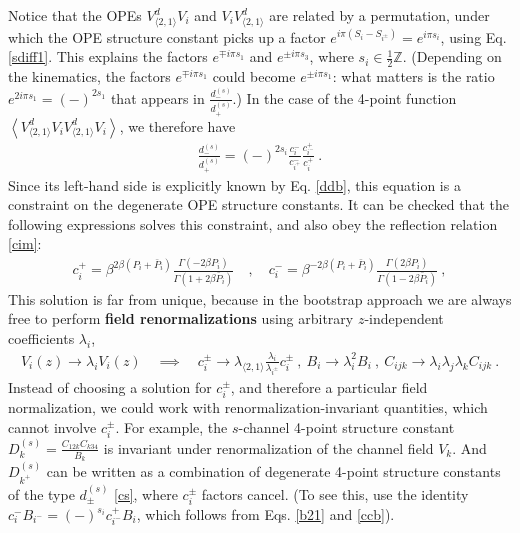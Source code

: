 \documentclass[12pt, a4paper]{article}
\newcommand{\myindex}[1]{\textbf{\boldmath #1}}
\begin{document}
Notice that the OPEs $V^d_{\langle 2,1\rangle}V_i$ and $V_iV^d_{\langle 2,1\rangle}$ are related by a permutation, under which the OPE structure constant picks up a factor $e^{i\pi(S_i-S_{i^\pm})} = e^{i\pi s_i}$, using Eq. \eqref{sdiff1}. 
This explains the factors $e^{\mp i\pi s_1}$ and $e^{\pm i\pi s_3}$, where $s_i\in\frac12\mathbb{Z}$.
(Depending on the kinematics, the factors $e^{\mp i\pi s_1}$ could become $e^{\pm i\pi s_1}$: what matters is the ratio $e^{2i\pi s_1}=(-)^{2s_1}$ that appears in $\frac{d^{(s)}_-}{d^{(s)}_+}$.)
In the case of the 4-point function $\left<V_{\langle 2,1\rangle}^d V_iV_{\langle 2,1\rangle}^d V_i\right>$, we therefore have
\begin{align}
 \frac{d^{(s)}_-}{d^{(s)}_+}= (-)^{2s_i}\frac{c_i^-}{c_{i^+}^-} \frac{c_{i^-}^+}{c_i^+}\ .
 \label{ddcccc}
\end{align}
Since its left-hand side is explicitly known by Eq. \eqref{ddb}, this equation is a constraint on the degenerate OPE structure constants.
It can be checked that the following expressions solves this constraint, and also obey the reflection relation \eqref{cim}: 
\begin{align}
 c^+_i = \beta^{2\beta(P_i+\bar P_i)} \frac{\Gamma(-2\beta P_i)}{\Gamma(1+2\beta \bar P_i)} \quad , \quad c^-_i = \beta^{-2\beta(P_i+\bar P_i)} \frac{\Gamma(2\beta P_i)}{\Gamma(1-2\beta \bar P_i)}\ ,
 \label{cpcm}
\end{align}
This solution is far from unique, because in the bootstrap approach we are always free to perform \myindex{field renormalizations} using arbitrary $z$-independent coefficients $\lambda_i$,
\begin{align}
 V_i(z) \to \lambda_i V_i(z)\quad \implies \quad c_i^\pm \to \lambda_{\langle 2,1\rangle}\frac{\lambda_i}{\lambda_{i^\pm}}c_i^\pm \ , \  B_i \to \lambda_i^2B_i \ , \ C_{ijk}\to \lambda_i\lambda_j\lambda_k C_{ijk}\ .
 \label{vlv}
\end{align}
Instead of choosing a solution for $c_i^\pm$, and therefore a particular field normalization, 
we could work with renormalization-invariant quantities, which cannot involve $c_i^\pm$. For example, the $s$-channel 4-point structure constant $D^{(s)}_k = \frac{C_{12k}C_{k34}}{B_k}$ is invariant under renormalization of the channel field $V_k$. And $D^{(s)}_{k^+}$ can be written as a combination of degenerate 4-point structure constants of the type $d^{(s)}_\pm$ \eqref{cs}, where $c_i^\pm$ factors cancel. (To see this, use the identity $c_i^- B_{i^-} = (-)^{s_i} c^+_{i^-} B_i$, which follows from Eqs. \eqref{b21} and \eqref{ccb}).
\end{document}
